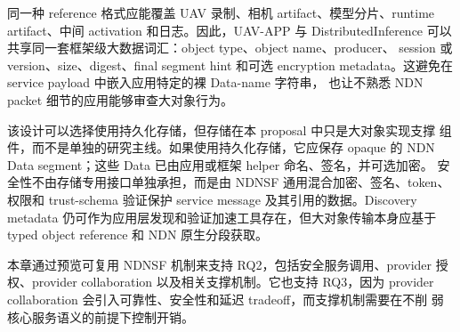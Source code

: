 同一种 reference 格式应能覆盖 UAV 录制、相机 artifact、模型分片、runtime
artifact、中间 activation 和日志。因此，UAV-APP 与 DistributedInference
可以共享同一套框架级大数据词汇：object type、object name、producer、
session 或 version、size、digest、final segment hint 和可选 encryption
metadata。这避免在 service payload 中嵌入应用特定的裸 Data-name 字符串，
也让不熟悉 NDN packet 细节的应用能够审查大对象行为。

该设计可以选择使用持久化存储，但存储在本 proposal 中只是大对象实现支撑
组件，而不是单独的研究主线。如果使用持久化存储，它应保存 opaque 的 NDN
Data segment；这些 Data 已由应用或框架 helper 命名、签名，并可选加密。
安全性不由存储专用接口单独承担，而是由 NDNSF 通用混合加密、签名、token、
权限和 trust-schema 验证保护 service message 及其引用的数据。Discovery
metadata 仍可作为应用层发现和验证加速工具存在，但大对象传输本身应基于
typed object reference 和 NDN 原生分段获取。

本章通过预览可复用 NDNSF 机制来支持 RQ2，包括安全服务调用、provider 授
权、provider collaboration 以及相关支撑机制。它也支持 RQ3，因为 provider
collaboration 会引入可靠性、安全性和延迟 tradeoff，而支撑机制需要在不削
弱核心服务语义的前提下控制开销。
